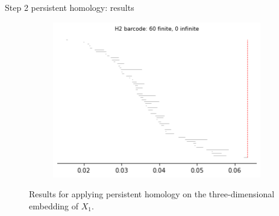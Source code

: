 \documentclass[xcolor={dvipsnames,svgnames}]{beamer}
\begin{document}
\begin{frame}{Step 2 persistent homology: results}
\begin{figure}[H]
\begin{subfigure}[b]{0.2\textwidth}
\includegraphics[width=\textwidth]{figures/X1_H2_barcode.png}
 \caption{}
\end{subfigure}
\caption{Results for applying persistent homology on the three-dimensional embedding of $X_1$.}
\end{figure}
\end{frame}
\end{document}
